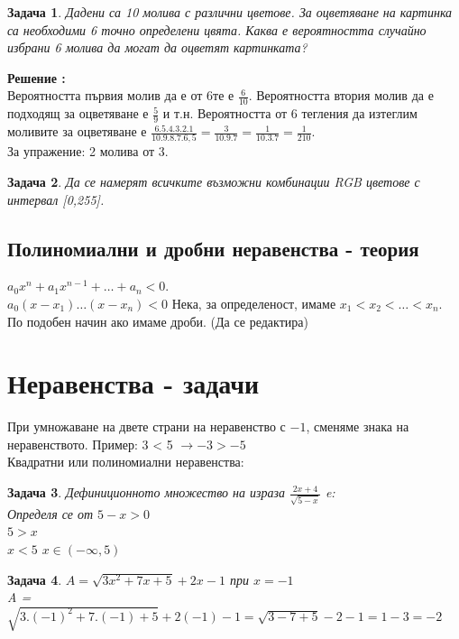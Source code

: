\documentclass{article}
\newtheorem{problem}{Задача}
\newcounter{solution}
\newcommand\solution{%
	\stepcounter{solution}%
	\textbf{Решение :}\\%
}
\begin{document}
\begin{problem}
	Дадени са 10 молива с различни цветове. За оцветяване на картинка са необходими 6 точно определени цвята. Каква е вероятността случайно избрани 6 молива да могат да оцветят картинката?
\end{problem}
\solution
Вероятността първия молив да е от 6те е $\frac{6}{10}$. Вероятността втория молив да е подходящ за оцветяване е  $\frac{5}{9}$ и т.н. Вероятността от 6 тегления да изтеглим моливите за оцветяване е $\frac{6.5.4.3.2.1}{10.9.8.7.6,5} = \frac{3}{10.9.7} = \frac{1}{10.3.7} = \frac{1}{210}$. \\
За упражение: 2 молива от 3.



\begin{problem}
	Да се намерят всичките възможни комбинации RGB цветове с интервал [0,255].
\end{problem}

\subsection{Полиномиални и дробни неравенства - теория}
$a_0 x^n + a_1 x^{n-1} + \dots  + a_n < 0$. \\
$a_0(x-x_1)\dots (x-x_n) < 0$
Нека, за определеност, имаме $x_1 < x_2 < \dots < x_n $. По подобен начин ако имаме дроби. (Да се редактира)

	\section{Неравенства - задачи}
	При умножаване на двете страни на неравенство с $-1$, сменяме знака на неравенството. Пример:
	 3 < 5  $ \to -3>-5 $ \\
	 
	 Квадратни или полиномиални неравенства:
	 
	 
	\begin{problem}
		Дефиниционното множество на израза $\frac{2x+4}{\sqrt{5-x}} $ e: \\
		Определя се от $5-x > 0 $ \\
		 $ 5 > x  $\\
		  $x < 5  $ 
		$x \in \left( -\infty , 5 \right) $
	\end{problem}
	
	
	\begin{problem}
		$A = \sqrt{3x^2 + 7x + 5}+2x -1$ при $x =-1	  $ \\
		A = $\sqrt {3.(-1)^2 + 7.(-1) +5 } +2(-1) -1 = \sqrt{3 -7 +5} - 2 - 1 = 1 -3 = -2$
	\end{problem}
	
\end{document}
